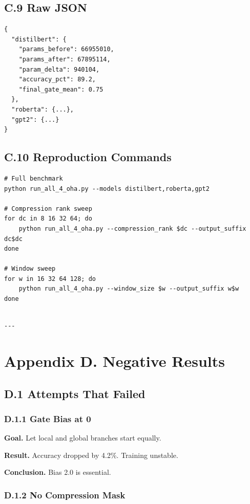 \subsection{C.9 Raw JSON}

\begin{lstlisting}
{
  "distilbert": {
    "params_before": 66955010,
    "params_after": 67895114,
    "param_delta": 940104,
    "accuracy_pct": 89.2,
    "final_gate_mean": 0.75
  },
  "roberta": {...},
  "gpt2": {...}
}
\end{lstlisting}

\subsection{C.10 Reproduction Commands}

\begin{lstlisting}
# Full benchmark
python run_all_4_oha.py --models distilbert,roberta,gpt2

# Compression rank sweep
for dc in 8 16 32 64; do
    python run_all_4_oha.py --compression_rank $dc --output_suffix dc$dc
done

# Window sweep
for w in 16 32 64 128; do
    python run_all_4_oha.py --window_size $w --output_suffix w$w
done
\end{lstlisting}
\begin{lstlisting}

---
\end{lstlisting}


\section{Appendix D. Negative Results}

\subsection{D.1 Attempts That Failed}

\subsubsection{D.1.1 Gate Bias at 0}

\textbf{Goal.} Let local and global branches start equally.

\textbf{Result.} Accuracy dropped by 4.2\%. Training unstable.

\textbf{Conclusion.} Bias 2.0 is essential.

\subsubsection{D.1.2 No Compression Mask}

